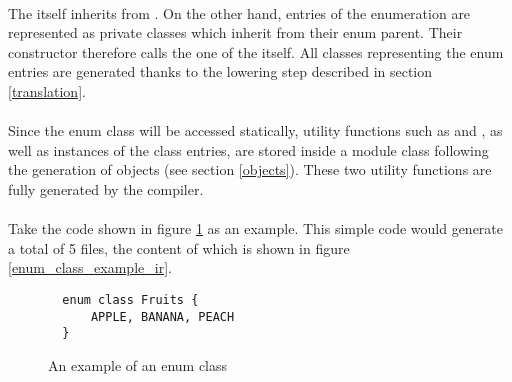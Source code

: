 \paragraph{} The  itself inherits from . On the 
other hand, entries of the enumeration are represented as private classes which inherit from their 
enum parent. Their constructor therefore calls the one of the  itself. All 
classes representing the enum entries are generated thanks to the lowering step described in 
section \ref{translation}.

\paragraph{} Since the enum class will be accessed statically, utility functions such as 
 and , as well as instances of the class entries, 
are stored inside a module class following the generation of objects (see section 
\ref{objects}). These two utility functions are fully generated by the compiler.

\paragraph{} Take the code shown in figure \ref{enum_class_example} as an example. This simple code 
would generate a total of 5 files, the content of which is shown in figure 
\ref{enum_class_example_ir}.

\begin{figure}[h]
  \begin{verbatim}
  enum class Fruits {
      APPLE, BANANA, PEACH
  }
  \end{verbatim}
  \caption{An example of an enum class}
  \label{enum_class_example}
\end{figure}


